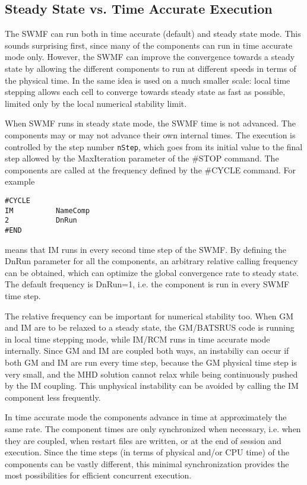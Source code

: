 \subsection{Steady State vs. Time Accurate Execution}

The SWMF can run both in time accurate (default) and
steady state mode. This sounds surprising first, 
since many of the components can run in time accurate 
mode only. However, the SWMF can improve the convergence
towards a steady state by allowing the different components
to run at different speeds in terms of the physical time.
In \BATSRUS the same idea is used on a much smaller scale:
local time stepping allows each cell to converge towards
steady state as fast as possible, limited only by the local
numerical stability limit.

When SWMF runs in steady state mode, the SWMF time is not
advanced. The components may or may not advance their own
internal times. The execution is controlled by the 
step number {\tt nStep}, which goes from its initial value 
to the final step allowed by the MaxIteration parameter
of the \#STOP command. The components are called at
the frequency defined by the \#CYCLE command. For example
\begin{verbatim}
#CYCLE
IM          NameComp
2           DnRun
#END
\end{verbatim}
means that IM runs in every second time step of the SWMF.
By defining the DnRun parameter for all the components,
an arbitrary relative calling frequency can be obtained,
which can optimize the global convergence rate to steady state.
The default frequency is DnRun=1, i.e. the component is
run in every SWMF time step. 

The relative frequency can be important for numerical
stability too. When GM and IM are to be relaxed
to a steady state, the GM/BATSRUS code is running in 
local time stepping mode, while IM/RCM runs in time 
accurate mode internally. Since GM and IM are coupled
both ways, an instabiliy can occur if both GM and IM
are run every time step, because the GM physical time
step is very small, and the MHD solution cannot relax
while being continuously pushed by the IM coupling.
This unphysical instability can be avoided by calling the
IM component less frequently.

In time accurate mode the components advance in time at
approximately the same rate. The component times are
only synchronized when necessary, i.e. when they
are coupled, when restart files are written, or 
at the end of session and execution. Since the time
steps (in terms of physical and/or CPU time) of the components can be 
vastly different, this minimal synchronization provides the 
most possibilities for efficient concurrent execution.

